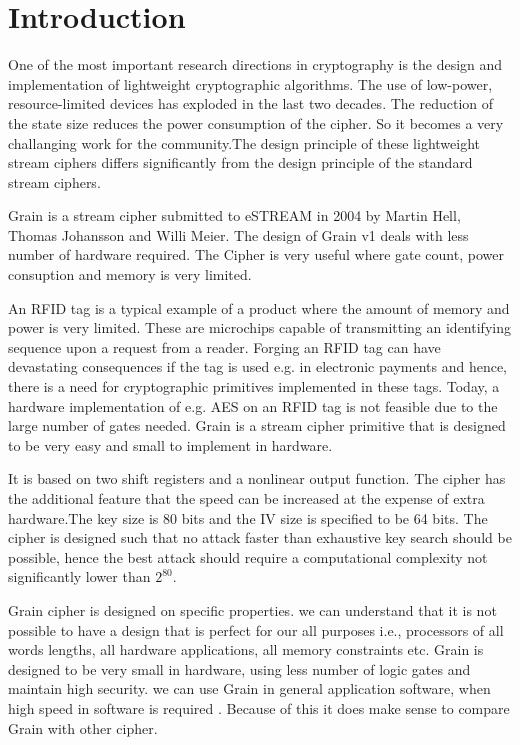 \section{Introduction}
One of the most important research directions in cryptography is the design and implementation of lightweight cryptographic algorithms. The use of low-power, resource-limited devices has exploded in the last two decades. The reduction of the state size reduces the power consumption of the cipher. So it becomes a very challanging work for the community.The design principle of these lightweight stream ciphers differs significantly from the design principle of the standard stream ciphers.

Grain is a stream cipher submitted to eSTREAM in 2004 by Martin Hell, Thomas Johansson and Willi Meier. The design of Grain v1 deals with less number of hardware required. The Cipher is very useful where gate count, power consuption and memory is very limited. 

An RFID tag is a typical example of a product where the amount of memory and power is very limited. These are microchips capable of transmitting an identifying sequence upon a request from a reader. Forging an RFID tag can have devastating consequences if the tag is used e.g. in electronic payments and hence, there is a need for cryptographic primitives implemented in these tags. Today, a hardware implementation of e.g. AES on an RFID tag is not feasible due to the large number of gates needed. Grain is a stream cipher primitive that is designed to be very easy and small to implement in hardware.

It is based on two shift registers and a nonlinear output function. The cipher has the additional
feature that the speed can be increased at the expense of extra hardware.The key size is 80 bits
and the IV size is specified to be 64 bits. The cipher is designed such that no attack faster than
exhaustive key search should be possible, hence the best attack should require a computational
complexity not significantly lower than $2^{80}$.

Grain cipher is designed on specific properties. we can understand that it is not possible to have
a design that is perfect for our all purposes i.e., processors of all words lengths, all hardware
applications, all memory constraints etc. Grain is designed to be very small in hardware, using
less number of logic gates and maintain high security. we can use Grain in general application
software, when high speed in software is required . Because of this it does make sense to compare
Grain with other cipher.

